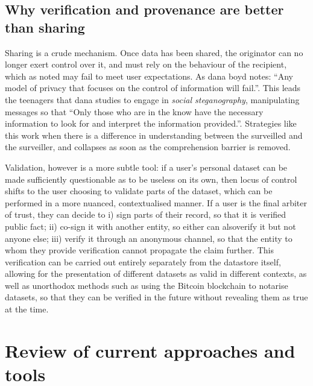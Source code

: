 \documentclass{IOS-Book-Article}     %
\begin{document}
\subsection*{Why verification and provenance are better than sharing}

Sharing is a crude mechanism. Once data has been shared, the originator can no
longer exert control over it, and must rely on the behaviour of the recipient,
which as noted may fail to meet user expectations. As dana boyd
notes: ``Any model of privacy that focuses on the control of information will
fail.''. This leads the teenagers that dana studies to
engage in \emph{social steganography}, manipulating messages so that ``Only 
those who are in the know have the necessary information to look for and interpret the information 
provided.''\cite{boyd2012Networked}. Strategies like this work when there is a
difference in understanding between the surveilled and the surveiller, and
collapses as soon as the comprehension barrier is removed.

Validation, however is a more subtle tool:
if a user’s personal dataset can be made sufficiently questionable as to be useless on its own,
then locus of control shifts to the user choosing to validate parts of the dataset,
which can be performed in a more nuanced,
contextualised manner. If a user is the final arbiter of trust, they can decide
to i) sign parts of their record, so that it is verified public fact; ii)
co-sign it with another entity, so either can  alsoverify it but not anyone 
else;
iii) verify it through an anonymous channel, so that the entity to whom they
provide verification cannot propagate the claim further. This verification can
be carried out entirely separately from the datastore itself, allowing for the
presentation of different datasets as valid  in different contexts, as well as
unorthodox methods such as using the Bitcoin blockchain to notarise datasets, so
that they can be verified in the future without revealing them as true at the
time.

\section{Review of current approaches and tools} 
\end{document}
